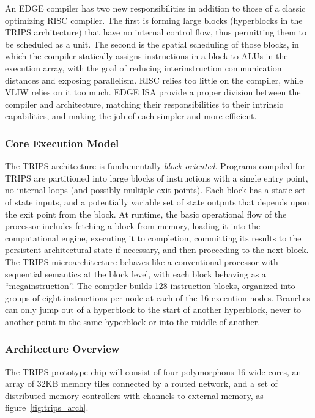 \documentclass[UTF8,12pt,a4paper]{article}
\begin{document}
An EDGE compiler has two new responsibilities in addition to those of a classic optimizing RISC compiler.
The first is forming large blocks (hyperblocks in the TRIPS architecture) that have no internal control flow,
thus permitting them to be scheduled as a unit.
The second is the spatial scheduling of those blocks,
in which the compiler statically assigns instructions in a block to ALUs in the execution array,
with the goal of reducing interinstruction communication distances and exposing parallelism.
RISC relies too little on the compiler, while VLIW relies on it too much. 
EDGE ISA provide a proper division between the compiler and architecture,
matching their responsibilities to their intrinsic capabilities,
and making the job of each simpler and more efficient.

\subsubsection{Core Execution Model}
The TRIPS architecture is fundamentally \emph{block oriented}.
Programs compiled for TRIPS are partitioned into large blocks of instructions
with a single entry point, no internal loops (and possibly multiple exit points).
Each block has a static set of state inputs,
and a potentially variable set of state outputs
that depends upon the exit point from the block.
At runtime, the basic operational flow of the processor includes fetching a block from memory,
loading it into the computational engine, executing it to completion,
committing its results to the persistent architectural state if necessary,
and then proceeding to the next block.
The TRIPS microarchitecture behaves like a conventional processor with sequential semantics at the block level,
with each block behaving as a ``megainstruction''.
The compiler builds 128-instruction blocks,
organized into groups of eight instructions per node at each of the 16 execution nodes.
Branches can only jump out of a hyperblock to the start of another hyperblock,
never to another point in the same hyperblock or into the middle of another.

\subsubsection{Architecture Overview}
The TRIPS prototype chip will consist of four polymorphous 16-wide cores,
an array of 32KB memory tiles connected by a routed network,
and a set of distributed memory controllers with channels to external memory,
as figure~\ref{fig:trips_arch}.
\end{document}
